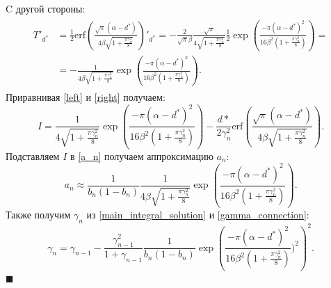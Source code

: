 \documentclass{mipt-thesis-bs}
\begin{document}
C другой стороны:
\begin{multline}
    \label{right}
    \begin{aligned}
        T'_{d^*} &= \frac{1}{2} \text{erf}\left(\frac{\sqrt{\pi} (\alpha-d^*)}{4  \beta \sqrt{1+\frac{\pi\gamma_n^2}{8}}} \right)'_{d^*} = - \frac{2}{\sqrt{\pi} \beta} \frac{\sqrt{\pi}}{4 \sqrt{1+\frac{\pi\gamma_n^2}{8}}}
        \frac{1}{2} \exp\left( \frac{- \pi (\alpha-d^*)^2}{16  \beta^2 ( 1+\frac{\pi\gamma_n^2}{8})}\right) =\\
        &= - \frac{1}{4  \beta \sqrt{1+\frac{\pi\gamma_n^2}{8}}}
        \exp\left( \frac{- \pi (\alpha-d^*)^2}{16  \beta^2( 1+\frac{\pi\gamma_n^2}{8})}\right).
    \end{aligned}
\end{multline}
Приравнивая \ref{left} и \ref{right} получаем:
\begin{equation}
    \label{main_integral_solution}
    I= \frac{1}{4 \sqrt{1+\frac{\pi\gamma_n^2}{8}}} \exp\left( \frac{- \pi (\alpha-d^*)^2}{16 \beta^2 ( 1+\frac{\pi\gamma_n^2}{8})}\right) - \frac{d*}{2 \gamma_n^2} \text{erf}\left(\frac{\sqrt{\pi} (\alpha-d^*)}{4 \beta\sqrt{1+\frac{\pi\gamma_n^2}{8}}} \right).   
\end{equation}
Подставляем $I$ в \ref{a_n} получаем аппроксимацию ${a_n}$:
\begin{equation}
     a_n \approx \frac{1}{b_n(1-b_n)} \frac{1}{4  \beta \sqrt{1+\frac{\pi\gamma_n^2}{8}}} \exp\left( \frac{- \pi (\alpha-d^*)^2}{16  \beta^2 ( 1+\frac{\pi\gamma_n^2}{8})}\right).
\end{equation}
Также получим $\gamma_n$ из \ref{main_integral_solution} и \ref{gamma_connection}: 
\begin{equation}
    \gamma_n = \gamma_{n-1} - \frac{\gamma_{n-1}^2}{1+\gamma_{n-1}} \frac{1}{b_n(1-b_n)}
    \exp\left(\frac{- \pi (\alpha-d^*)^2}{16  \beta^2 ( 1+\frac{\pi\gamma_n^2}{8})})^2\right)^2.
\end{equation}
$\blacksquare$
\end{document}
